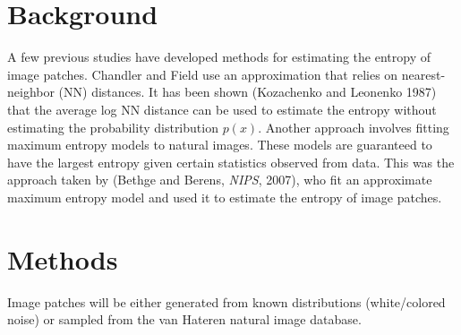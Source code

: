\documentclass[10pt,twocolumn,letterpaper]{article}
\begin{document}

\section{Background}
A few previous studies have developed methods for estimating the entropy of image patches. Chandler and Field use an approximation that relies on nearest-neighbor (NN) distances. It has been shown (Kozachenko and Leonenko 1987) that the average log NN distance can be used to estimate the entropy without estimating the probability distribution $p(x)$. Another approach involves fitting maximum entropy models to natural images. These models are guaranteed to have the largest entropy given certain statistics observed from data. This was the approach taken by (Bethge and Berens, \textit{NIPS}, 2007), who fit an approximate maximum entropy model and used it to estimate the entropy of image patches.
\section{Methods}
Image patches will be either generated from known distributions (white/colored noise) or sampled from the van Hateren natural image database.
\end{document}
